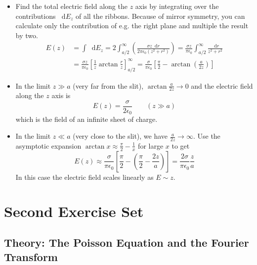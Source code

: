 \documentclass[11pt, a4paper]{article}
\newcommand{\diff}{\mathop{}\!\mathrm{d}} %
\newcommand{\ee}{\epsilon_{0}}  %
\begin{document}
\begin{itemize}
	\item Find the total electric field along the $ z $ axis by integrating over the contributions $ \diff E_{z} $ of all the ribbons. Because of mirror symmetry, you can calculate only the contribution of e.g. the right plane and multiple the result by two.
	\begin{align*}
		E(z) &= \int \diff E_{z} = 2 \int_{a/2}^{\infty} \left(\frac{\sigma z \diff r}{2\pi \ee (z^{2} + r^{2})}\right) = \frac{\sigma z}{\pi \ee} \int_{a/2}^{\infty} \frac{\diff r}{z^{2} + r^{2}}\\
		&= \frac{\sigma z}{\pi \ee} \left[\frac{1}{z}\arctan \frac{r}{z}\right]_{a/2}^{\infty} = \frac{\sigma}{\pi \ee} \left[\frac{\pi}{2} - \arctan(\frac{a}{2z})\right]
	\end{align*}
	
	\item In the limit $ z \gg a $ (very far from the slit), $ \arctan\frac{a}{2z} \to 0 $ and the electric field along the $ z $ axis is 
	\begin{equation*}
		E(z) = \frac{\sigma}{2 \ee} \qquad (z \gg a)
	\end{equation*}
	which is the field of an infinite sheet of charge.
	
	\item In the limit $ z \ll a $ (very close to the slit), we have $ \frac{a}{2z} \to \infty $. Use the asymptotic expansion $ \arctan x \approx \frac{\pi}{2} - \frac{1}{x} $ for large $ x $ to get
	\begin{equation*}
		E(z) \approx \frac{\sigma}{\pi \ee} \left[\frac{\pi}{2} - \left(\frac{\pi}{2} - \frac{2z}{a}\right)\right] = \frac{2\sigma}{\pi \ee} \frac{z}{a}
	\end{equation*}
	In this case the electric field scales linearly as $ E \sim z $. 
\end{itemize} 


\section{Second Exercise Set}
\subsection{Theory: The Poisson Equation and the Fourier Transform}
\end{document}
